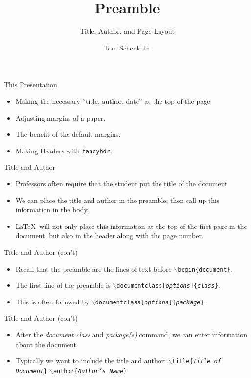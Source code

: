 \documentclass[pdf]{prosper}
\title{Preamble}
\subtitle{Title, Author, and Page Layout}
\author{Tom Schenk Jr.}		%
\begin{document}
\maketitle
\begin{slide}{This Presentation}
	\begin{itemize}
		\item Making the necessary ``title, author, date'' at the top of the page.
		\item Adjusting margins of a paper.
		\item The benefit of the default margins.
		\item Making Headers with \texttt{fancyhdr}.
	\end{itemize}
\end{slide}
\begin{slide}{Title and Author}
	\begin{itemize}
		\item Professors often require that the student put the title of the document
		\item We can place the title and author in the preamble, then call up this information in the body.
		\item \LaTeX\ will not only place this information at the top of the first page in the document, but also in the header along with the page number.
	\end{itemize}
\end{slide}
\begin{slide}{Title and Author (con't)}
	\begin{itemize}
		\item Recall that the preamble are the lines of text before \texttt{$\backslash$begin\{document\}}.
		\item The first line of the preamble is \texttt{$\backslash$documentclass[\textit{options}]\{\textit{class}\}}.
		\item This is often followed by \texttt{$\backslash$documentclass[\textit{options}]\{\textit{package}\}}.
	\end{itemize}
\end{slide}
\begin{slide}{Title and Author (con't)}
	\begin{itemize}
		\item After the \textit{document class} and \textit{package(s)} command, we can enter information about the document.
		\item Typically we want to include the title and author:
				\texttt{$\backslash$title\{\textit{Title of Document}\}}
				\texttt{$\backslash$author\{\textit{Author's Name}\}}
	\end{itemize}
\end{slide}
\end{document}
